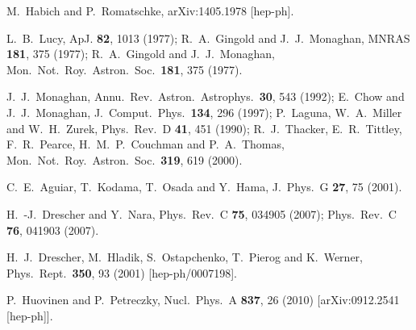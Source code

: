 \begin{thebibliography}{99}
  M.~Habich and P.~Romatschke,
  arXiv:1405.1978 [hep-ph].







L.~B.~Lucy, ApJ. {\bf 82}, 1013 (1977); R.~A.~Gingold and J.~J.~Monaghan, MNRAS {\bf 181}, 375 (1977); R.~A.~Gingold and J.~J.~Monaghan,
  Mon.\ Not.\ Roy.\ Astron.\ Soc.\  {\bf 181}, 375 (1977).


J.~J.~Monaghan, Annu.\ Rev.\ Astron.\ Astrophys.\ {\bf 30}, 543 (1992); E.~Chow and J.~J.~Monaghan, J.\ Comput.\ Phys.\ {\bf 134}, 296 (1997); P.~Laguna, W.~A.~Miller and W.~H.~Zurek, Phys.\ Rev.\ D {\bf 41}, 451 (1990); 
  R.~J.~Thacker, E.~R.~Tittley, F.~R.~Pearce, H.~M.~P.~Couchman and P.~A.~Thomas,
  Mon.\ Not.\ Roy.\ Astron.\ Soc.\  {\bf 319}, 619 (2000).

  C.~E.~Aguiar, T.~Kodama, T.~Osada and Y.~Hama,
  J.\ Phys.\ G {\bf 27}, 75 (2001).
  
  H.~-J.~Drescher and Y.~Nara,
  Phys.\ Rev.\ C {\bf 75}, 034905 (2007); 
  Phys.\ Rev.\ C {\bf 76}, 041903 (2007).
  
  H.~J.~Drescher, M.~Hladik, S.~Ostapchenko, T.~Pierog and K.~Werner,
  Phys.\ Rept.\  {\bf 350}, 93 (2001)
  [hep-ph/0007198].
  
  P.~Huovinen and P.~Petreczky,
  Nucl.\ Phys.\ A {\bf 837}, 26 (2010)
  [arXiv:0912.2541 [hep-ph]].
  

\end{thebibliography}
